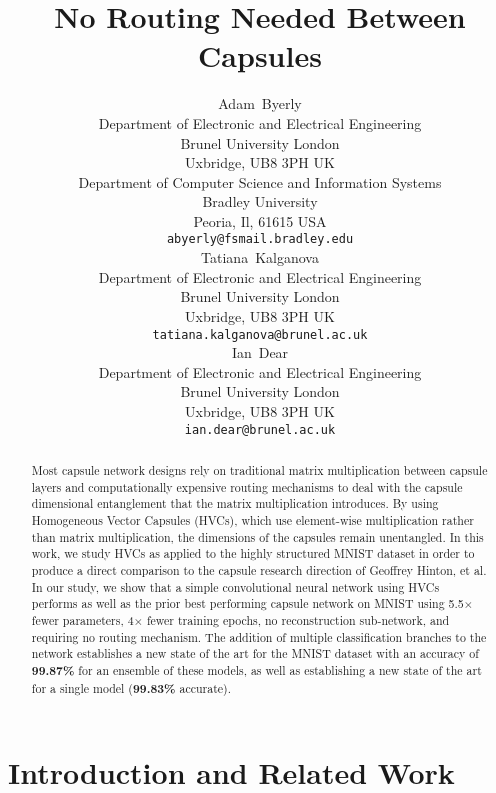 \documentclass{article}
\date{} \renewcommand{\undertitle}{} \renewcommand{\headeright}{}
\title{No Routing Needed Between Capsules}
\author{
  Adam~Byerly\\
  Department of Electronic and Electrical Engineering\\
  Brunel University London\\
  Uxbridge, UB8 3PH UK \\
  Department of Computer Science and Information Systems\\
  Bradley University\\
  Peoria, Il, 61615 USA\\
  \texttt{abyerly@fsmail.bradley.edu} \\
  \And{}
  Tatiana~Kalganova \\
  Department of Electronic and Electrical Engineering\\
  Brunel University London\\
  Uxbridge, UB8 3PH UK \\
  \texttt{tatiana.kalganova@brunel.ac.uk} \\
  \And{}
  Ian~Dear \\
  Department of Electronic and Electrical Engineering\\
  Brunel University London\\
  Uxbridge, UB8 3PH UK \\
  \texttt{ian.dear@brunel.ac.uk}
}
\begin{document}
\maketitle

\begin{abstract}
  Most capsule network designs rely on traditional matrix multiplication between capsule layers and computationally expensive routing mechanisms to deal with the capsule dimensional entanglement that the matrix multiplication introduces.  By using Homogeneous Vector Capsules (HVCs), which use element-wise multiplication rather than matrix multiplication, the dimensions of the capsules remain unentangled.  In this work, we study HVCs as applied to the highly structured MNIST dataset in order to produce a direct comparison to the capsule research direction of Geoffrey Hinton, et al.  In our study, we show that a simple convolutional neural network using HVCs performs as well as the prior best performing capsule network on MNIST using 5.5\(\times{}\) fewer parameters, 4\(\times{}\) fewer training epochs, no reconstruction sub-network, and requiring no routing mechanism.  The addition of multiple classification branches to the network establishes a new state of the art for the MNIST dataset with an accuracy of \textbf{99.87\%} for an ensemble of these models, as well as establishing a new state of the art for a single model (\textbf{99.83\%} accurate).
\end{abstract}


\section{Introduction and Related Work}\label{sec:introduction}
\end{document}
